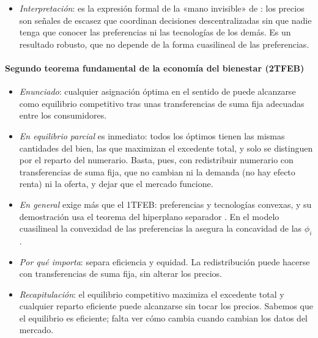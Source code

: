 \documentclass[11pt]{article}
\begin{document}
\begin{itemize}
  \begin{itemize}
  \item con poder de mercado, el precio supera al coste marginal ;
  \item con externalidades o bienes públicos, el coste o el beneficio marginal privado no es el social ;
  \item con un impuesto, el precio del consumidor se separa del precio del productor (\ref{sec:introduccion-impuesto}).
  \end{itemize}
\item \emph{Interpretación}: es la expresión formal de la «mano invisible» de  : los precios son señales de escasez que coordinan decisiones descentralizadas sin que nadie tenga que conocer las preferencias ni las tecnologías de los demás. Es un resultado robusto, que no depende de la forma cuasilineal de las preferencias.
\end{itemize}

\paragraph{Segundo teorema fundamental de la economía del bienestar (2TFEB)}

\begin{itemize}
\item \emph{Enunciado}: cualquier asignación óptima en el sentido de  puede alcanzarse como equilibrio competitivo tras unas transferencias de suma fija adecuadas entre los consumidores.
\item \emph{En equilibrio parcial} es inmediato: todos los óptimos tienen las mismas cantidades del bien, las que maximizan el excedente total, y solo se distinguen por el reparto del numerario. Basta, pues, con redistribuir numerario con transferencias de suma fija, que no cambian ni la demanda (no hay efecto renta) ni la oferta, y dejar que el mercado funcione\nocite{MasColellWhinstonGreen1995}.
\item \emph{En general} exige más que el 1TFEB: preferencias y tecnologías convexas, y su demostración usa el teorema del hiperplano separador . En el modelo cuasilineal la convexidad de las preferencias la asegura la concavidad de las $\phi_i$.
\item \emph{Por qué importa}: separa eficiencia y equidad. La redistribución puede hacerse con transferencias de suma fija, sin alterar los precios.
\item \emph{Recapitulación}: el equilibrio competitivo maximiza el excedente total y cualquier reparto eficiente puede alcanzarse sin tocar los precios. Sabemos que el equilibrio es eficiente; falta ver cómo cambia cuando cambian los datos del mercado.
\end{itemize}
\end{document}
